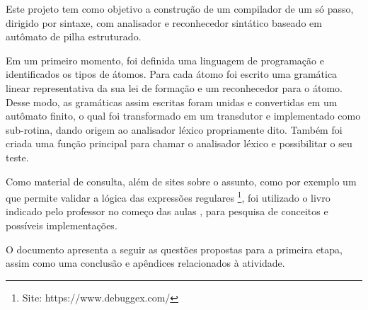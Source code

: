 
Este projeto tem como objetivo a construção de um compilador de um só passo, dirigido por sintaxe, com analisador e reconhecedor sintático baseado em autômato de pilha estruturado.

Em um primeiro momento, foi definida uma linguagem de programação e identificados os tipos de átomos. Para cada átomo foi escrito uma gramática linear representativa da sua lei de formação e um reconhecedor para o átomo. Desse modo, as gramáticas assim escritas foram unidas e convertidas em um autômato finito, o qual foi transformado em um transdutor e implementado como sub-rotina, dando origem ao analisador léxico propriamente dito. Também foi criada uma função principal para chamar o analisador léxico e possibilitar o seu teste.

Como material de consulta, além de sites sobre o assunto, como por exemplo um que permite validar a lógica das expressões regulares \footnote{Site: https://www.debuggex.com/}, foi utilizado o livro indicado pelo professor no começo das aulas \cite{intro-compiladores}, para pesquisa de conceitos e possíveis implementações.

O documento apresenta a seguir as questões propostas para a primeira etapa, assim como uma conclusão e apêndices relacionados à atividade.
